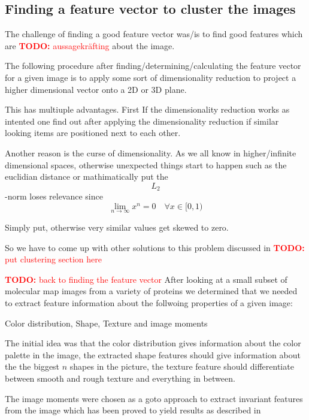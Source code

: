 \documentclass[journal]{vgtc}       %
\newcommand{\todo}[1]{\textcolor{red}{\textbf{TODO:} #1}}
\begin{document}
\subsection{Finding a feature vector to cluster the images}

The challenge of finding a good feature vector was/is to find good features which are \todo{aussagekräfting} about the image.

The following procedure after finding/determining/calculating the feature vector for a given image is to apply some sort of dimensionality reduction to project a higher dimensional vector onto a 2D or 3D plane.

This has multiuple advantages. First If the dimensionality reduction works as intented one find out after applying the dimensionality reduction if similar looking items are positioned next to each other.

Another reason is the curse of dimensionality. As we all know in higher/infinite dimensional spaces, otherwise unexpected things start to happen such as the euclidian distance or mathimatically put the \begin{equation} L_2 \end{equation}-norm loses relevance since
 \begin{equation}
   \lim_{n\rightarrow \infty} x^n = 0 \quad \forall x \in [0,1)
\end{equation}

Simply put, otherwise very similar values get skewed to zero.

So we have to come up with other solutions to this problem discussed in \todo{put clustering section here}


\todo{back to finding the feature vector}
After looking at a small subset of molecular map images from a variety of proteins we determined that we needed to extract feature information about the follwoing properties of a given image: 

Color distribution, Shape, Texture and image moments 

The initial idea was that the color distribution gives information about the color palette in the image, the extracted shape features should give information about the the biggest \( n \) shapes in the picture, the texture feature should differentiate between smooth and rough texture and everything in between.

The image moments were chosen as a goto approach to extract invariant features from the image which has been proved to yield results as described in \cite{kolesar}
\end{document}

